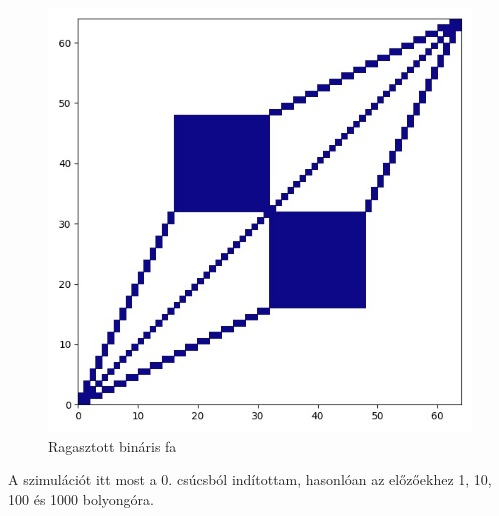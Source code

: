 \begin{figure}[H]
  \centering
  \includegraphics[width=0.5\linewidth]{./figures/ragasztott_binaris/graph.jpg}
  \caption{Ragasztott bináris fa}
\end{figure}

A szimulációt itt most a $0.$ csúcsból indítottam, hasonlóan az előzőekhez
1, 10, 100 és 1000 bolyongóra.

